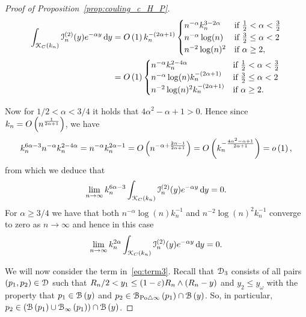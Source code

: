 \begin{proof}[Proof of Proposition~\ref{prop:couling_c_H_P}]
\begin{align*}
	\int_{{\mathcal K}_{C}(k_n)} \mathcal{I}_n^{(2)}(y) e^{-\alpha y} \operatorname{\mathrm{d}\hspace{-2pt}} y
	&= O\left(1\right) k_n^{-(2\alpha + 1)}\begin{cases}
				n^{-\alpha} k_n^{3 - 2\alpha} &\mbox{if } \frac{1}{2} < \alpha < \frac{3}{2}\\
				n^{-\alpha} \log(n) &\mbox{if } \frac{3}{2} \le \alpha < 2\\
				n^{-2} \log(n)^{2} &\mbox{if } \alpha \ge 2,
		\end{cases}	\\
	&= O\left(1\right) \begin{cases}
				n^{-\alpha} k_n^{2 - 4\alpha} &\mbox{if } \frac{1}{2} < \alpha < \frac{3}{2}\\
				n^{-\alpha} \log(n)k_n^{-(2\alpha + 1)} &\mbox{if } \frac{3}{2} \le \alpha < 2\\
				n^{-2} \log(n)^{2} k_n^{-(2\alpha + 1)} &\mbox{if } \alpha \ge 2.
		\end{cases}
\end{align*}

Now for $1/2 < \alpha < 3/4$ it holds that $4\alpha^2 - \alpha + 1 > 0$. Hence since $k_n = O\left(n^{\frac{1}{2\alpha + 1}}\right)$, we have
\[
	k_n^{6\alpha - 3} n^{-\alpha} k_n^{2 - 4\alpha} = n^{-\alpha} k_n^{2\alpha - 1} = O\left(n^{-\alpha + \frac{2\alpha - 1}{2\alpha + 1}}\right) = O\left(k_n^{-\frac{4\alpha^2 - \alpha + 1}{2\alpha + 1}}\right) = o\left(1\right),
\]
from which we deduce that
\[
	\lim_{n \to \infty} k_n^{6\alpha - 3} \int_{{\mathcal K}_{C}(k_n)} \mathcal{I}_n^{(2)}(y)
	e^{-\alpha y} \operatorname{\mathrm{d}\hspace{-2pt}} y = 0.
\]
For $\alpha \ge 3/4$ we have that both $n^{-\alpha} \log(n) k_n^{-1}$ and $n^{-2} \log(n)^2 k_n^{-1}$ converge to zero as $n \to \infty$ and hence in this case
\[
	\lim_{n \to \infty} k_n^{2\alpha} \int_{{\mathcal K}_{C}(k_n)} \mathcal{I}_n^{(2)}(y)
	e^{-\alpha y} \operatorname{\mathrm{d}\hspace{-2pt}} y = 0.
\]

We will now consider the term in~\eqref{eq:term3}. 
Recall that $\mathcal{D}_{3}$ consists of all pairs $(p_1, p_2 ) \in \mathcal{D}_{}$ such that $R_n/2 < y_1 \leq (1-\varepsilon)R_n \wedge (R_n-y)$ and $y_2 \leq y_\omega$ with the property that 
$p_1 \in {\mathcal B}\left(y\right)$ and $p_2 \in {\mathcal B}_{{\mathrm{Po}} \bigtriangleup \infty}\left(p_1\right) \cap {\mathcal B}\left(y\right)$.    
So, in particular, $p_2 \in ({\mathcal B}\left(p_1\right) \cup {\mathcal B}_{\infty}\left(p_1\right)) \cap {\mathcal B}\left(y\right)$.


\end{proof}
